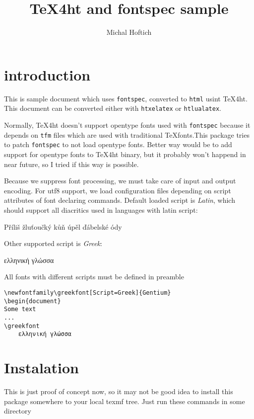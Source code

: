 \documentclass{article}
\begin{document}
	\title{TeX4ht and fontspec sample}
	\author{Michal Hoftich}
	\maketitle
	\section{introduction}

	This is sample document which uses \texttt{fontspec}, converted to 
	\verb|html| usint \TeX 4ht. This document can be converted either with 
	\verb|htxelatex| or \verb|htlualatex|. 

	Normally, \TeX 4ht doesn't support opentype fonts used with 
	\verb|fontspec| because it depends on \verb|tfm| files which are 
	used with traditional \TeX fonts.This package tries to patch 
	\verb|fontspec| to not load opentype fonts. 
	Better way would be to add support for opentype fonts to 
	\TeX 4ht binary, but it probably won't happend in near future, 
	so I tried if this way is possible.

	Because we suppress font processing, we must take care of input 
	and output encoding. For utf8 support, we load configuration files 
	depending on script attributes of font declaring commands. 
	Default loaded script is \emph{Latin}, which should support all diacritics 
	used in languages with latin script:

	Příliš žluťoučký kůň úpěl ďábelské ódy

	Other supported script is \emph{Greek}:

	\greekfont
	ελληνική γλώσσα

	All fonts with different scripts must be defined in preamble

	\begin{verbatim}
\newfontfamily\greekfont[Script=Greek]{Gentium}
\begin{document}
Some text
...
\greekfont
	ελληνική γλώσσα
	\end{verbatim} 
	\section{Instalation}

	This is just proof of concept now, so it may not be good idea 
	to install this package somewhere to your local texmf tree. 
	Just run these commands in some directory
\end{document}
